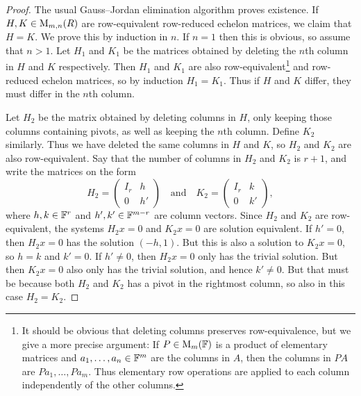 \begin{proof}
    The usual Gauss--Jordan elimination algorithm proves existence. If $H, K \in \mathrm{M}_{m,n}(R)$ are row-equivalent row-reduced echelon matrices, we claim that $H = K$. We prove this by induction in $n$. If $n = 1$ then this is obvious, so assume that $n > 1$. Let $H_1$ and $K_1$ be the matrices obtained by deleting the $n$th column in $H$ and $K$ respectively. Then $H_1$ and $K_1$ are also row-equivalent\footnote{It should be obvious that deleting columns preserves row-equivalence, but we give a more precise argument: If $P \in \mathrm{M}_{m}(\mathbb{F})$ is a product of elementary matrices and $a_1, \ldots, a_n \in \mathbb{F}^m$ are the columns in $A$, then the columns in $PA$ are $Pa_1, \ldots, Pa_m$. Thus elementary row operations are applied to each column independently of the other columns.} and row-reduced echelon matrices, so by induction $H_1 = K_1$. Thus if $H$ and $K$ differ, they must differ in the $n$th column.

    Let $H_2$ be the matrix obtained by deleting columns in $H$, only keeping those columns containing pivots, as well as keeping the $n$th column. Define $K_2$ similarly. Thus we have deleted the same columns in $H$ and $K$, so $H_2$ and $K_2$ are also row-equivalent. Say that the number of columns in $H_2$ and $K_2$ is $r+1$, and write the matrices on the form
    \begin{equation*}
        H_2
            = \begin{pmatrix}
                I_r & h \\
                0   & h'
            \end{pmatrix}
        \quad \text{and} \quad
        K_2
            = \begin{pmatrix}
                I_r & k \\
                0   & k'
            \end{pmatrix},
    \end{equation*}
    where $h,k \in \mathbb{F}^r$ and $h',k' \in \mathbb{F}^{m-r}$ are column vectors. Since $H_2$ and $K_2$ are row-equivalent, the systems $H_2 x = 0$ and $K_2 x = 0$ are solution equivalent. If $h' = 0$, then $H_2 x = 0$ has the solution $(-h,1)$. But this is also a solution to $K_2 x = 0$, so $h = k$ and $k' = 0$. If $h' \neq 0$, then $H_2 x = 0$ only has the trivial solution. But then $K_2 x = 0$ also only has the trivial solution, and hence $k' \neq 0$. But that must be because both $H_2$ and $K_2$ has a pivot in the rightmost column, so also in this case $H_2 = K_2$.
\end{proof}

